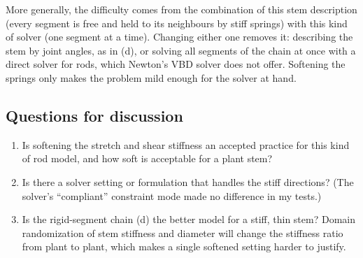 More generally, the difficulty comes from the combination of this stem description (every segment is free
and held to its neighbours by stiff springs) with this kind of solver (one segment at a time). Changing
either one removes it: describing the stem by joint angles, as in (d), or solving all segments of the chain
at once with a direct solver for rods, which Newton's VBD solver does not offer. Softening the springs only
makes the problem mild enough for the solver at hand.

\subsection{Questions for discussion}

\begin{enumerate}
  \item Is softening the stretch and shear stiffness an accepted practice for this kind of rod model, and
        how soft is acceptable for a plant stem?
  \item Is there a solver setting or formulation that handles the stiff directions? (The solver's
        ``compliant'' constraint mode made no difference in my tests.)
  \item Is the rigid-segment chain (d) the better model for a stiff, thin stem? Domain randomization of
        stem stiffness and diameter will change the stiffness ratio from plant to plant, which makes a
        single softened setting harder to justify.
\end{enumerate}
